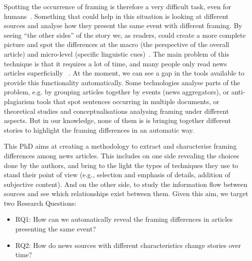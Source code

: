 Spotting the occurrence of framing is therefore a very difficult task, even for humans~\cite{morstatter2018identifying}. Something that could help in this situation is looking at different sources and analyse how they present the same event with different framing.
By seeing ``the other sides'' of the story we, as readers, could create a more complete picture and spot the differences at the macro (the perspective of the overall article) and micro-level (specific linguistic cues)~\cite{gamson1989media}.
The main problem of this technique is that it requires a lot of time,
and many people only read news articles superficially%
~\cite{pennycook2019lazy}.
At the moment, we can see a gap in the tools available to provide this functionality automatically.
Some technologies analyse parts of the problem, e.g. by grouping articles together by events (news aggregators), or anti-plagiarism tools that spot sentences occurring in multiple documents, or theoretical studies and conceptualisations analysing framing under different aspects.
But in our knowledge, none of them is is bringing together different stories to highlight the framing differences in an automatic way.



This PhD aims at creating a methodology to extract and characterise framing differences among news articles.
This includes on one side revealing the choices done by the authors, and bring to the light the types of techniques they use to stand their point of view (e.g., selection and emphasis of details, addition of subjective content).
And on the other side, to study the information flow between sources and see which relationships exist between them. %
Given this aim, we target two Research Questions:

\begin{itemize}
    \item RQ1: How can we automatically reveal the framing differences in articles presenting the same event?
    \item RQ2: How do news sources with different characteristics change stories over time?
\end{itemize}

